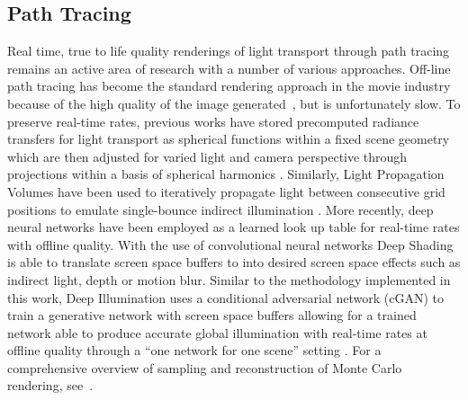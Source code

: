 \subsection{Path Tracing}
Real time, true to life quality renderings of light transport through path tracing~\cite{Kajiya:1986:RE:15922.15902} remains an active area of research with a number of various approaches. Off-line path tracing has become the standard rendering approach in the movie industry because of the high quality of the image generated~\cite{Keller:2015:PTR:2776880.2792699}, but is unfortunately slow. To preserve real-time rates, previous works have stored precomputed radiance transfers for light transport as spherical functions within a fixed scene geometry which are then adjusted for varied light and camera perspective through projections within a basis of spherical harmonics \cite{sloanPrecompRad}. Similarly, Light Propagation Volumes have been used to iteratively propagate light between consecutive grid positions to emulate single-bounce indirect illumination \cite{kaplanyanCasac}. More recently, deep neural  networks have been employed as a learned look up table for real-time rates with offline quality. With the use of convolutional neural networks Deep Shading is able to translate screen space buffers to into desired screen space effects such as indirect light, depth or motion blur. Similar to the methodology implemented in this work, Deep Illumination uses a conditional adversarial network (cGAN) to train a generative network with screen space buffers allowing for a trained network able to produce accurate global illumination with real-time rates at offline quality through a ``one network for one scene'' setting  \cite{deepillum}. For a comprehensive overview of sampling and reconstruction of Monte Carlo rendering, see~\cite{zwicker15star}.